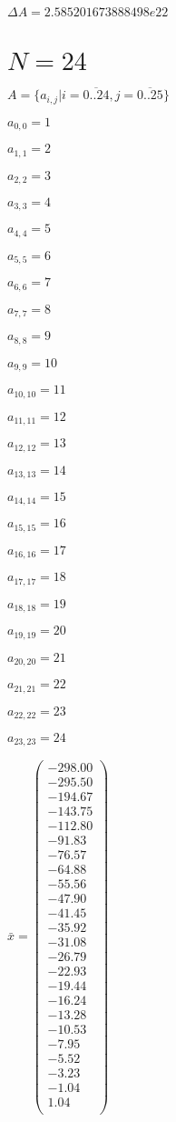 \documentclass[a4paper,12pt]{article}
\begin{document}
$\Delta A = 2.585201673888498e22$



\section{ $N = 24$ }
$A = \{ a _{ i, j } | i = \overline { 0..24 }, j = \overline { 0..25 } \}$

$a _{ 0, 0 } = 1$

$a _{ 1, 1 } = 2$

$a _{ 2, 2 } = 3$

$a _{ 3, 3 } = 4$

$a _{ 4, 4 } = 5$

$a _{ 5, 5 } = 6$

$a _{ 6, 6 } = 7$

$a _{ 7, 7 } = 8$

$a _{ 8, 8 } = 9$

$a _{ 9, 9 } = 10$

$a _{ 10, 10 } = 11$

$a _{ 11, 11 } = 12$

$a _{ 12, 12 } = 13$

$a _{ 13, 13 } = 14$

$a _{ 14, 14 } = 15$

$a _{ 15, 15 } = 16$

$a _{ 16, 16 } = 17$

$a _{ 17, 17 } = 18$

$a _{ 18, 18 } = 19$

$a _{ 19, 19 } = 20$

$a _{ 20, 20 } = 21$

$a _{ 21, 21 } = 22$

$a _{ 22, 22 } = 23$

$a _{ 23, 23 } = 24$

$\bar { x } = \begin{pmatrix}
-298.00 \\
-295.50 \\
-194.67 \\
-143.75 \\
-112.80 \\
-91.83 \\
-76.57 \\
-64.88 \\
-55.56 \\
-47.90 \\
-41.45 \\
-35.92 \\
-31.08 \\
-26.79 \\
-22.93 \\
-19.44 \\
-16.24 \\
-13.28 \\
-10.53 \\
-7.95 \\
-5.52 \\
-3.23 \\
-1.04 \\
1.04 \\
\end{pmatrix}
$
\end{document}
